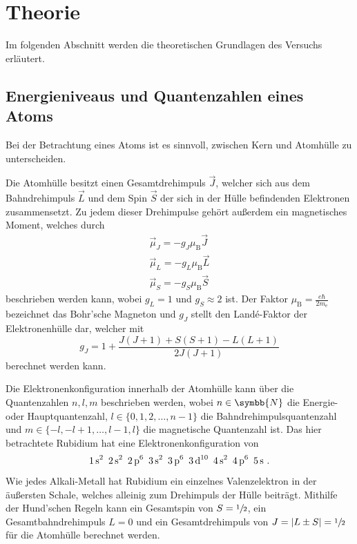 \section{Theorie}
\label{sec:theorie}

    Im folgenden Abschnitt werden die theoretischen Grundlagen des Versuchs erläutert.

\subsection{Energieniveaus und Quantenzahlen eines Atoms}
\label{sec:energieaufspaltung}

    Bei der Betrachtung eines Atoms ist es sinnvoll,
    zwischen Kern und Atomhülle zu unterscheiden.

    Die Atomhülle besitzt einen Gesamtdrehimpuls $\vec{J}$,
    welcher sich aus dem Bahndrehimpuls $\vec{L}$ und dem Spin $\vec{S}$ der sich in der Hülle befindenden Elektronen zusammensetzt.
    Zu jedem dieser Drehimpulse gehört außerdem ein magnetisches Moment,
    welches durch
    \begin{gather*}
        \vec{\mu}_J = -g_J \mu_\text{B} \vec{J} \\
        \vec{\mu}_L = -g_L \mu_\text{B} \vec{L} \\
        \vec{\mu}_S = -g_S \mu_\text{B} \vec{S}
    \end{gather*}
    beschrieben werden kann,
    wobei $g_L = 1$ und $g_S \approx 2$ ist.
    Der Faktor $\mu_\text{B} = \frac{e \hbar}{2m_\text{e}}$ bezeichnet das Bohr'sche Magneton und $g_J$ stellt den Landé-Faktor der Elektronenhülle dar,
    welcher mit
    \begin{equation}
        g_J = 1 + \frac{J(J+1) + S(S+1) - L(L+1)}{2J(J+1)}
        \label{eqn:landeJ}
    \end{equation}
    berechnet werden kann.

    Die Elektronenkonfiguration innerhalb der Atomhülle kann über die Quantenzahlen $n, l, m$ beschrieben werden,
    wobei $n \in \symbb{N}$ die Energie- oder Hauptquantenzahl,
    ${ l \in \{0, 1, 2, \ldots, n-1\} }$ die Bahndrehimpulsquantenzahl und ${ m \in \{-l, -l+1, \ldots, l-1, l\} }$ die magnetische Quantenzahl ist.
    Das hier betrachtete Rubidium hat eine Elektronenkonfiguration von
    \[
        \ce{1s^2 \, 2s^2 \, 2p^6 \, 3s^2 \, 3p^6 \, 3d^10 \, 4s^2 \, 4p^6 \, 5s} \ .
    \]
    Wie jedes Alkali-Metall hat Rubidium ein einzelnes Valenzelektron in der äußersten Schale,
    welches alleinig zum Drehimpuls der Hülle beiträgt.
    Mithilfe der Hund'schen Regeln kann ein Gesamtspin von $S = \sfrac{1}{2}$,
    ein Gesamtbahndrehimpuls $L=0$ und ein Gesamtdrehimpuls von $J = \lvert L \pm S \rvert = \sfrac{1}{2}$ für die Atomhülle berechnet werden.


